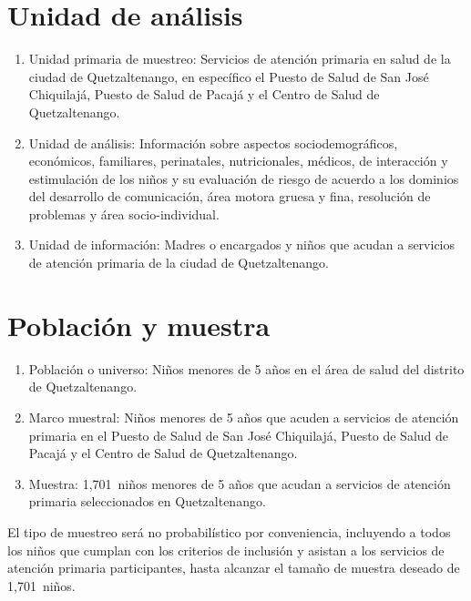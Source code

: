 \documentclass[11pt,letterpaper]{report}
\newcommand{\tiempito}{durante 2,025}
\newcommand{\muestradeseada}{1,701}
\begin{document}
\section{Unidad de análisis}
	\begin{enumerate}
		\item Unidad primaria de muestreo: Servicios de atención primaria en
		salud de la ciudad de Quetzaltenango, en específico el Puesto de
		Salud de San José Chiquilajá, Puesto de Salud de Pacajá y el Centro de
		Salud de Quetzaltenango.
		\item Unidad de análisis: Información sobre aspectos sociodemográficos,
		económicos, familiares, perinatales, nutricionales, médicos, de
		interacción y estimulación de los niños y su evaluación de riesgo de
		acuerdo a los dominios del desarrollo de comunicación, área motora
		gruesa y fina, resolución de problemas y área socio-individual.
		\item Unidad de información: Madres o encargados y niños que acudan a
		servicios de atención primaria de la ciudad de Quetzaltenango.
	\end{enumerate}

\section{Población y muestra}
	\begin{enumerate}
		\item Población o universo: Niños menores de 5 años en el área de salud
		del distrito de Quetzaltenango.
		\item Marco muestral: Niños menores de 5 años que acuden a servicios de
		atención primaria en el Puesto de Salud de San José Chiquilajá, Puesto
		de Salud de Pacajá y el Centro de Salud de Quetzaltenango. %
		\item Muestra: \muestradeseada\ niños menores de 5 años que acudan a
		servicios de atención primaria seleccionados en Quetzaltenango.
	\end{enumerate}

El tipo de muestreo será no probabilístico por conveniencia, incluyendo a todos
los niños que cumplan con los criterios de inclusión y asistan a los servicios
de atención primaria participantes, hasta alcanzar el tamaño
de muestra deseado de \muestradeseada\ niños.
\end{document}
